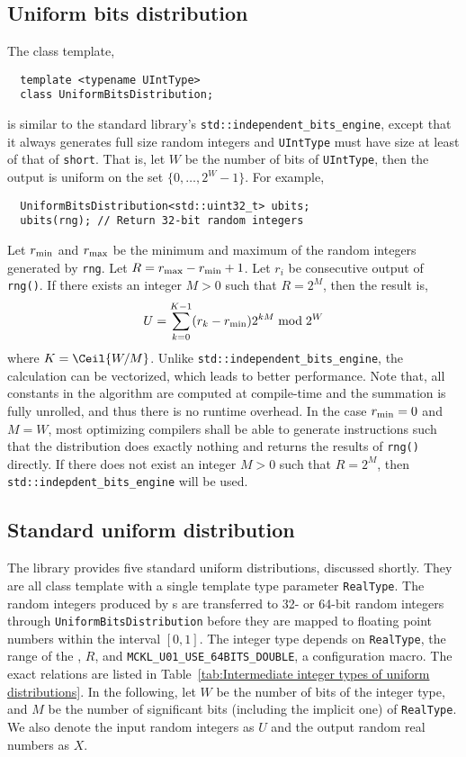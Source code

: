 \subsection{Uniform bits distribution}
\label{sub:Uniform bits distribution}

The class template,
\begin{Verbatim}
  template <typename UIntType>
  class UniformBitsDistribution;
\end{Verbatim}
is similar to the standard library's \verb|std::independent_bits_engine|,
except that it always generates full size random integers and \verb|UIntType|
must have size at least of that of \verb|short|. That is, let $W$ be the number
of bits of \verb|UIntType|, then the output is uniform on the set
$\{0,\dots,2^W - 1\}$. For example,
\begin{Verbatim}
  UniformBitsDistribution<std::uint32_t> ubits;
  ubits(rng); // Return 32-bit random integers
\end{Verbatim}
Let $r_{\mathrm{min}}$ and $r_{\mathrm{max}}$ be the minimum and maximum of the random integers
generated by \verb|rng|. Let $R = r_{\mathrm{max}} - r_{\mathrm{min}} + 1$. Let $r_i$ be consecutive
output of \verb|rng()|. If there exists an integer $M > 0$ such that $R = 2^M$,
then the result is,
\begin{equation*}
  U = \sum_{k = 0}^{K - 1} (r_k - r_{\mathrm{min}}) 2^{kM} \bmod 2^W
\end{equation*}
where $K = \Ceil{W / M}$. Unlike \verb|std::independent_bits_engine|, the
calculation can be vectorized, which leads to better performance. Note that,
all constants in the algorithm are computed at compile-time and the summation
is fully unrolled, and thus there is no runtime overhead. In the case $r_{\mathrm{min}} =
0$ and $M = W$, most optimizing compilers shall be able to generate
instructions such that the distribution does exactly nothing and returns the
results of \verb|rng()| directly. If there does not exist an integer $M > 0$
such that $R = 2^M$, then \verb|std::indepdent_bits_engine| will be used.

\subsection{Standard uniform distribution}
\label{sub:Standard uniform distribution}

The library provides five standard uniform distributions, discussed shortly.
They are all class template with a single template type parameter
\verb|RealType|. The random integers produced by \rng{}s are transferred to 32-
or 64-bit random integers through \verb|UniformBitsDistribution| before they
are mapped to floating point numbers within the interval $[0, 1]$. The integer
type depends on \verb|RealType|, the range of the \rng{}, $R$, and
\verb|MCKL_U01_USE_64BITS_DOUBLE|, a configuration macro. The exact relations
are listed in Table~\ref{tab:Intermediate integer types of uniform
  distributions}. In the following, let $W$ be the number of bits of the
integer type, and $M$ be the number of significant bits (including the implicit
one) of \verb|RealType|. We also denote the input random integers as $U$ and
the output random real numbers as $X$.

